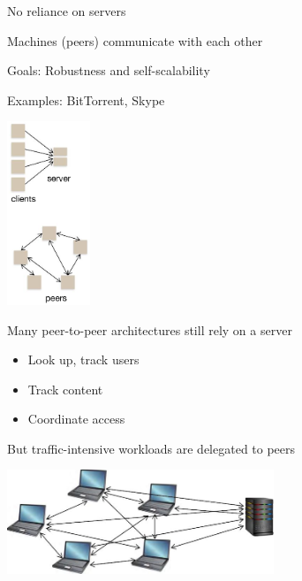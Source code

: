\begin{slide}

	
	\begin{minipage}{0.66\textwidth}
		No reliance on servers
		\bigskip
		
		Machines (peers) communicate with each other
		\bigskip
		
		Goals: Robustness and self-scalability
		\bigskip
		
		Examples: BitTorrent, Skype
	\end{minipage}
	\hfill
	\begin{minipage}{0.3\textwidth}
		\includegraphics[width=25mm]{p2p.png}
	\end{minipage}
	
\end{slide}

\begin{slide}

	
	Many peer-to-peer architectures still rely on a server
	\begin{itemize}
		\item Look up, track users
		\item Track content
		\item Coordinate access
	\end{itemize}
	\bigskip
	
	But traffic-intensive workloads are delegated to peers
	\medskip
	
	\includegraphics[width=80mm]{hybrid-model.png}

\end{slide}

